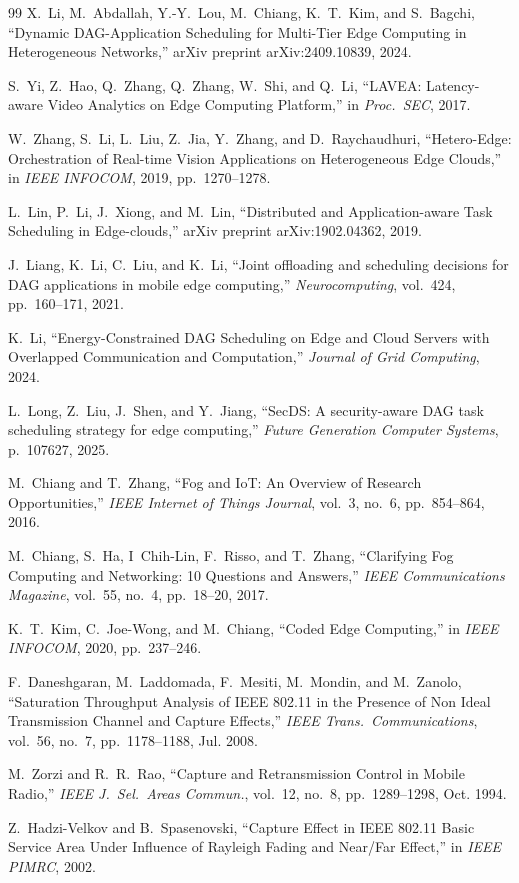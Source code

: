 \documentclass[conference]{IEEEtran}
\begin{document}
\begin{thebibliography}{99}
X.~Li, M.~Abdallah, Y.-Y.~Lou, M.~Chiang, K.~T.~Kim, and S.~Bagchi,
``Dynamic {DAG}-Application Scheduling for Multi-Tier Edge Computing in
Heterogeneous Networks,''
arXiv preprint arXiv:2409.10839, 2024.

S.~Yi, Z.~Hao, Q.~Zhang, Q.~Zhang, W.~Shi, and Q.~Li,
``{LAVEA}: Latency-aware Video Analytics on Edge Computing Platform,''
in \emph{Proc.\ SEC}, 2017.

W.~Zhang, S.~Li, L.~Liu, Z.~Jia, Y.~Zhang, and D.~Raychaudhuri,
``Hetero-Edge: Orchestration of Real-time Vision Applications on
Heterogeneous Edge Clouds,''
in \emph{IEEE INFOCOM}, 2019, pp.~1270--1278.

L.~Lin, P.~Li, J.~Xiong, and M.~Lin,
``Distributed and Application-aware Task Scheduling in Edge-clouds,''
arXiv preprint arXiv:1902.04362, 2019.

J.~Liang, K.~Li, C.~Liu, and K.~Li,
``Joint offloading and scheduling decisions for {DAG} applications in
mobile edge computing,''
\emph{Neurocomputing},
vol.~424, pp.~160--171, 2021.

K.~Li,
``Energy-Constrained {DAG} Scheduling on Edge and Cloud Servers with
Overlapped Communication and Computation,''
\emph{Journal of Grid Computing}, 2024.

L.~Long, Z.~Liu, J.~Shen, and Y.~Jiang,
``{SecDS}: A security-aware {DAG} task scheduling strategy for edge
computing,''
\emph{Future Generation Computer Systems}, p.~107627, 2025.

M.~Chiang and T.~Zhang,
``Fog and {IoT}: An Overview of Research Opportunities,''
\emph{IEEE Internet of Things Journal},
vol.~3, no.~6, pp.~854--864, 2016.

M.~Chiang, S.~Ha, I~Chih-Lin, F.~Risso, and T.~Zhang,
``Clarifying Fog Computing and Networking: 10 Questions and Answers,''
\emph{IEEE Communications Magazine},
vol.~55, no.~4, pp.~18--20, 2017.

K.~T.~Kim, C.~Joe-Wong, and M.~Chiang,
``Coded Edge Computing,''
in \emph{IEEE INFOCOM}, 2020, pp.~237--246.

F.~Daneshgaran, M.~Laddomada, F.~Mesiti, M.~Mondin, and M.~Zanolo,
``Saturation Throughput Analysis of {IEEE} 802.11 in the Presence of Non
Ideal Transmission Channel and Capture Effects,''
\emph{IEEE Trans.\ Communications},
vol.~56, no.~7, pp.~1178--1188, Jul. 2008.

M.~Zorzi and R.~R.~Rao,
``Capture and Retransmission Control in Mobile Radio,''
\emph{IEEE J.\ Sel.\ Areas Commun.},
vol.~12, no.~8, pp.~1289--1298, Oct. 1994.

Z.~Hadzi-Velkov and B.~Spasenovski,
``Capture Effect in {IEEE} 802.11 Basic Service Area Under Influence of
{R}ayleigh Fading and Near/Far Effect,''
in \emph{IEEE PIMRC}, 2002.

\end{thebibliography}
\end{document}

